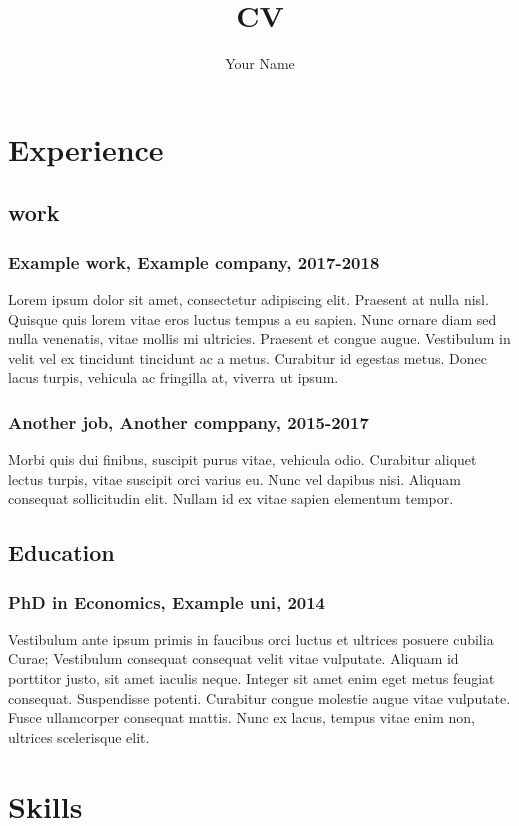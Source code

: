 \documentclass{article}
\title{CV}
\author{Your Name}
\begin{document}
\maketitle
\thispagestyle{empty}

\section{Experience}
\subsection{work}
\subsubsection{Example work, Example company, 2017-2018}
Lorem ipsum dolor sit amet, consectetur adipiscing elit. Praesent at nulla
nisl. Quisque quis lorem vitae eros luctus tempus a eu sapien. Nunc ornare diam
sed nulla venenatis, vitae mollis mi ultricies. Praesent et congue augue.
Vestibulum in velit vel ex tincidunt tincidunt ac a metus. Curabitur id egestas
metus. Donec lacus turpis, vehicula ac fringilla at, viverra ut ipsum.

\subsubsection{Another job, Another comppany, 2015-2017}
Morbi quis dui finibus, suscipit purus vitae, vehicula odio. Curabitur aliquet
lectus turpis, vitae suscipit orci varius eu. Nunc vel dapibus nisi. Aliquam
consequat sollicitudin elit. Nullam id ex vitae sapien elementum tempor.

\subsection{Education}
\subsubsection{PhD in Economics, Example uni, 2014}
Vestibulum ante ipsum primis in faucibus orci luctus et ultrices posuere
cubilia Curae; Vestibulum consequat consequat velit vitae vulputate. Aliquam id
porttitor justo, sit amet iaculis neque. Integer sit amet enim eget metus
feugiat consequat. Suspendisse potenti. Curabitur congue molestie augue vitae
vulputate. Fusce ullamcorper consequat mattis. Nunc ex lacus, tempus vitae enim
non, ultrices scelerisque elit.

\section{Skills}
\end{document}
